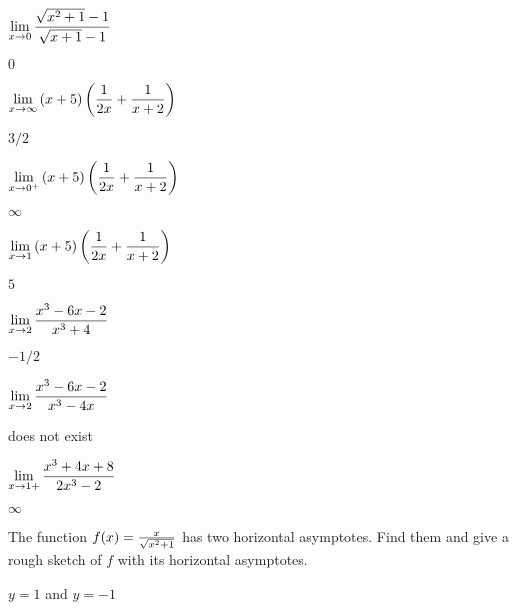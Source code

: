 \begin{exercises}
\begin{exercise} $\displaystyle\lim_{x\to0}{\sqrt{x^2+1}-1\over\sqrt{x+1}-1}$
\begin{answer} $0$
\end{answer}\end{exercise}

\begin{exercise} $\displaystyle\lim_{x\to\infty}{(x+5)\left({1\over 2x}+{1\over x+2}\right)}$
\begin{answer} $3/2$
\end{answer}\end{exercise}

\begin{exercise} $\displaystyle\lim_{x\to0^+}{(x+5)\left({1\over 2x}+{1\over x+2}\right)}$
\begin{answer} $\infty$
\end{answer}\end{exercise}

\begin{exercise} $\displaystyle\lim_{x\to1}{(x+5)\left({1\over 2x}+{1\over x+2}\right)}$
\begin{answer} $5$
\end{answer}\end{exercise}

\begin{exercise} $\displaystyle\lim_{x\to2}{x^3-6x-2\over x^3+4}$
\begin{answer} $-1/2$
\end{answer}\end{exercise}

\begin{exercise} $\displaystyle\lim_{x\to2}{x^3-6x-2\over x^3-4x}$
\begin{answer} does not exist
\end{answer}\end{exercise}

\begin{exercise} $\displaystyle\lim_{x\to1+}{x^3+4x+8\over 2x^3-2}$
\begin{answer} $\infty$
\end{answer}\end{exercise}

\endtwocol

\msk
\begin{exercise} The function $f(x) = {x\over\sqrt{x^2+1}}$ has two horizontal
 asymptotes.  Find them and give a rough sketch of $f$ with its horizontal
 asymptotes. 
\begin{answer} $y=1$ and $y=-1$
\end{answer}\end{exercise}

\end{exercises}

